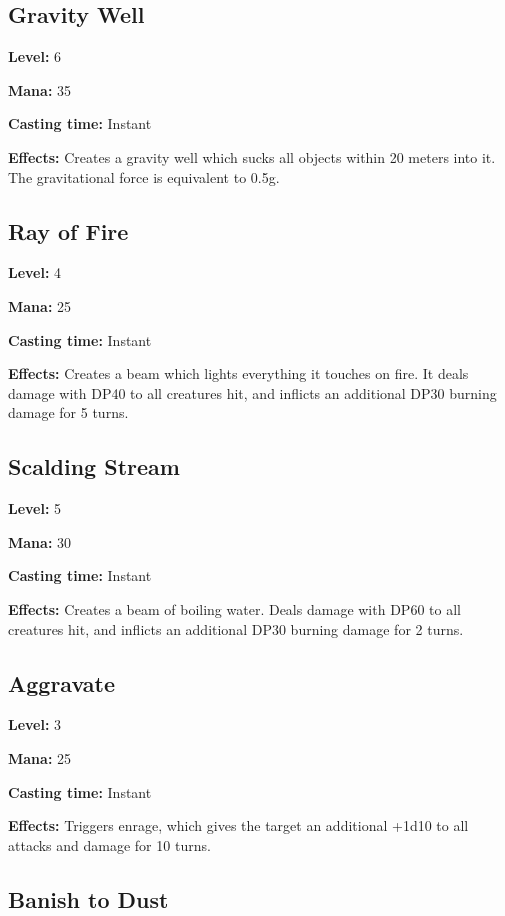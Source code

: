 \documentclass[]{article}
\begin{document}
\subsection{Gravity Well}\label{gravity-well}

\textbf{Level:} 6

\textbf{Mana:} 35

\textbf{Casting time:} Instant

\textbf{Effects:} Creates a gravity well which sucks all objects within
20 meters into it. The gravitational force is equivalent to 0.5g.

\subsection{Ray of Fire}\label{ray-of-fire}

\textbf{Level:} 4

\textbf{Mana:} 25

\textbf{Casting time:} Instant

\textbf{Effects:} Creates a beam which lights everything it touches on
fire. It deals damage with DP40 to all creatures hit, and inflicts an
additional DP30 burning damage for 5 turns.

\subsection{Scalding Stream}\label{scalding-stream}

\textbf{Level:} 5

\textbf{Mana:} 30

\textbf{Casting time:} Instant

\textbf{Effects:} Creates a beam of boiling water. Deals damage with
DP60 to all creatures hit, and inflicts an additional DP30 burning
damage for 2 turns.

\subsection{Aggravate}\label{aggravate}

\textbf{Level:} 3

\textbf{Mana:} 25

\textbf{Casting time:} Instant

\textbf{Effects:} Triggers enrage, which gives the target an additional
+1d10 to all attacks and damage for 10 turns.

\subsection{Banish to Dust}\label{banish-to-dust}
\end{document}
